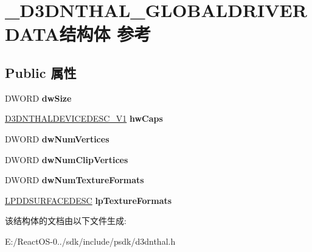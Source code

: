 \hypertarget{struct___d3_d_n_t_h_a_l___g_l_o_b_a_l_d_r_i_v_e_r_d_a_t_a}{}\section{\+\_\+\+D3\+D\+N\+T\+H\+A\+L\+\_\+\+G\+L\+O\+B\+A\+L\+D\+R\+I\+V\+E\+R\+D\+A\+T\+A结构体 参考}
\label{struct___d3_d_n_t_h_a_l___g_l_o_b_a_l_d_r_i_v_e_r_d_a_t_a}
\subsection*{Public 属性}
\begin{DoxyCompactItemize}
\item 
\mbox{\label{struct___d3_d_n_t_h_a_l___g_l_o_b_a_l_d_r_i_v_e_r_d_a_t_a_ada340a2016676c847b5ee5e7642f5bc6}} 
D\+W\+O\+RD {\bfseries dw\+Size}
\item 
\mbox{\label{struct___d3_d_n_t_h_a_l___g_l_o_b_a_l_d_r_i_v_e_r_d_a_t_a_a9f12f0f908202bd9aba00c2e8ed30129}} 
\hyperlink{struct___d3_d_n_t_h_a_l_device_desc___v1}{D3\+D\+N\+T\+H\+A\+L\+D\+E\+V\+I\+C\+E\+D\+E\+S\+C\+\_\+\+V1} {\bfseries hw\+Caps}
\item 
\mbox{\label{struct___d3_d_n_t_h_a_l___g_l_o_b_a_l_d_r_i_v_e_r_d_a_t_a_a4e3f536b8840317b134edd060c93f2e4}} 
D\+W\+O\+RD {\bfseries dw\+Num\+Vertices}
\item 
\mbox{\label{struct___d3_d_n_t_h_a_l___g_l_o_b_a_l_d_r_i_v_e_r_d_a_t_a_a1b03aea2608ef180a64f8eb166780a6a}} 
D\+W\+O\+RD {\bfseries dw\+Num\+Clip\+Vertices}
\item 
\mbox{\label{struct___d3_d_n_t_h_a_l___g_l_o_b_a_l_d_r_i_v_e_r_d_a_t_a_a13585350bf4847ea0ec6625fb3f79041}} 
D\+W\+O\+RD {\bfseries dw\+Num\+Texture\+Formats}
\item 
\mbox{\label{struct___d3_d_n_t_h_a_l___g_l_o_b_a_l_d_r_i_v_e_r_d_a_t_a_affea6a4388b4061d656bb5340eacd75f}} 
\hyperlink{interfacevoid}{L\+P\+D\+D\+S\+U\+R\+F\+A\+C\+E\+D\+E\+SC} {\bfseries lp\+Texture\+Formats}
\end{DoxyCompactItemize}


该结构体的文档由以下文件生成\+:\begin{DoxyCompactItemize}
\item 
E\+:/\+React\+O\+S-\/0../sdk/include/psdk/d3dnthal.\+h\end{DoxyCompactItemize}

